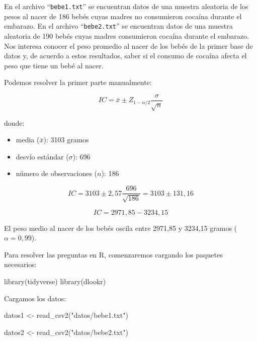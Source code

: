 \documentclass[
  spanish,
  a4paper,
]{scrbook}
\newenvironment{Shaded}{\begin{snugshade}}{\end{snugshade}}
\newcommand{\FunctionTok}[1]{\textcolor[rgb]{0.28,0.35,0.67}{#1}}
\newcommand{\NormalTok}[1]{\textcolor[rgb]{0.00,0.23,0.31}{#1}}
\newcommand{\OtherTok}[1]{\textcolor[rgb]{0.00,0.23,0.31}{#1}}
\newcommand{\StringTok}[1]{\textcolor[rgb]{0.13,0.47,0.30}{#1}}
\begin{document}
En el archivo ``\texttt{bebe1.txt}'' se encuentran datos de una muestra
aleatoria de los pesos al nacer de 186 bebés cuyas madres no consumieron
cocaína durante el embarazo. En el archivo ``\texttt{bebe2.txt}'' se
encuentran datos de una muestra aleatoria de 190 bebés cuyas madres
consumieron cocaína durante el embarazo. Nos interesa conocer el peso
promedio al nacer de los bebés de la primer base de datos y, de acuerdo
a estos resultados, saber si el consumo de cocaína afecta el peso que
tiene un bebé al nacer.

Podemos resolver la primer parte manualmente:

\[ 
IC = \bar{x} \pm Z_{1-\alpha/2}\frac{\sigma}{\sqrt{n}} 
\]

donde:

\begin{itemize}
\item
  media (\(\bar{x}\)): 3103 gramos
\item
  desvío estándar (\(\sigma\)): 696
\item
  número de observaciones (\(n\)): 186
\end{itemize}

\[ 
IC = 3103 \pm 2,57\frac{696}{\sqrt{186}} = 3103 \pm 131,16 
\]

\[
IC = 2971,85 - 3234,15
\]

El peso medio al nacer de los bebés oscila entre 2971,85 y 3234,15
gramos (\(\alpha = 0,99\)).

Para resolver las preguntas en R, comenzaremos cargando los paquetes
necesarios:

\begin{Shaded}
\begin{Highlighting}[]
\FunctionTok{library}\NormalTok{(tidyverse)}
\FunctionTok{library}\NormalTok{(dlookr)}
\end{Highlighting}
\end{Shaded}

Cargamos los datos:

\begin{Shaded}
\begin{Highlighting}[]
\NormalTok{datos1 }\OtherTok{\textless{}{-}} \FunctionTok{read\_csv2}\NormalTok{(}\StringTok{"datos/bebe1.txt"}\NormalTok{)}

\NormalTok{datos2 }\OtherTok{\textless{}{-}} \FunctionTok{read\_csv2}\NormalTok{(}\StringTok{"datos/bebe2.txt"}\NormalTok{)}
\end{Highlighting}
\end{Shaded}
\end{document}
